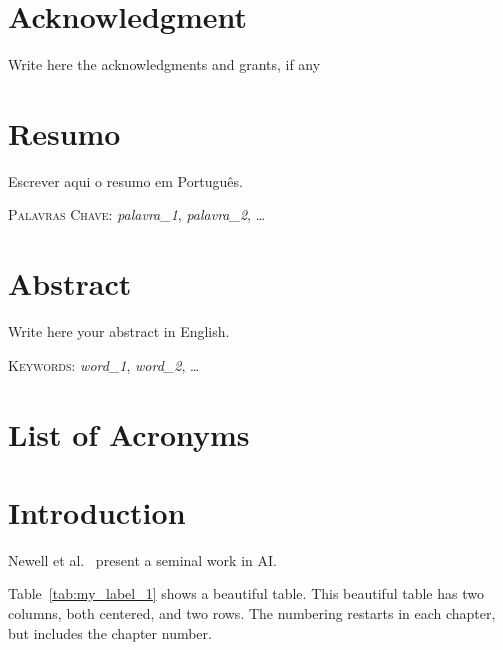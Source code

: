 \documentclass[12pt,reqno, twoside]{amsbook}
\theoremstyle{plain}
\numberwithin{equation}{chapter}
\numberwithin{section}{chapter}
\numberwithin{table}{chapter}
\numberwithin{figure}{chapter}
\begin{document}
\chapter*{Acknowledgment}

Write here the acknowledgments and grants, if any

\chapter*{Resumo}

Escrever aqui o resumo em Português.

\vspace{3ex}
\textsc{Palavras Chave:} \textit{palavra\_1}, \textit{palavra\_2}, \dots

\chapter*{Abstract}

Write here your abstract in English.

\vspace{3ex}
\textsc{Keywords:} \textit{word\_1}, \textit{word\_2}, \dots

\tableofcontents
\listoffigures
\listoftables
\cleardoublepage
\chapter*{List of Acronyms}
\begin{acronym}
\end{acronym}

\mainmatter

%

\setcounter{page}{1} 

\chapter{Introduction}
\label{ch:introduction}

\noindent Newell et al.~\cite{newell:et:al:1958} present a seminal work in \ac{AI}.

Table~\ref{tab:my_label_1} shows a beautiful table. This beautiful table has two columns, both centered, and two rows. The numbering restarts in each chapter, but includes the chapter number.
\end{document}
